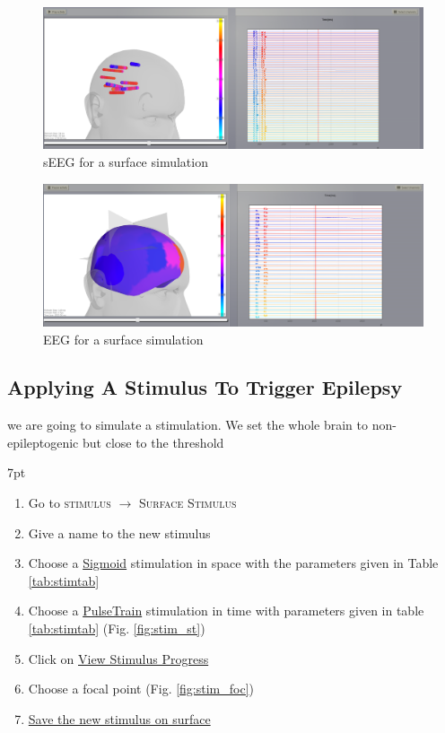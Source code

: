 \documentclass{tufte-handout}
\newenvironment{formal}{%
  \def\FrameCommand{%
    \hspace{1pt}%
    {\color{DarkBlue}\vrule width 2pt}%
    {\color{formalshade}\vrule width 4pt}%
    \colorbox{formalshade}%
  }%
  \MakeFramed{\advance\hsize-\width\FrameRestore}%
  \noindent\hspace{-4.55pt}%
  \begin{adjustwidth}{}{7pt}%
  \vspace{2pt}\vspace{2pt}%
}
{%
  \vspace{2pt}\end{adjustwidth}\endMakeFramed%
}
\begin{document}
\begin{figure}[h]
  \includegraphics[width=\linewidth]{Handout_UI_ModellingAnEpilepticPatient_sEEGSurface}%
  \caption{sEEG for a surface simulation}%
  \label{fig:surf_sEEG}%
\end{figure}

\begin{figure}[h]
  \includegraphics[width=\linewidth]{Handout_UI_ModellingAnEpilepticPatient_EEGSurface}%
  \caption{EEG for a surface simulation}%
  \label{fig:surf_EEG}%
\end{figure}

\subsection{Applying A Stimulus To Trigger Epilepsy}

 we are going to simulate a stimulation.
We set the whole brain to non-epileptogenic but close to the threshold

  \begin{formal}
  \begin{enumerate}
  \item Go to \textsc{stimulus} $\rightarrow$ \textsc{Surface Stimulus}
  \item Give a name to the new stimulus
  \item Choose a \underline{Sigmoid} stimulation in space with the parameters given in Table \ref{tab:stimtab}
  \item Choose a \underline{PulseTrain} stimulation in time with parameters given in table \ref{tab:stimtab} (Fig. \ref{fig:stim_st})
  \item Click on \underline{View Stimulus Progress}
  \item Choose a focal point (Fig. \ref{fig:stim_foc})
  \item \underline{Save the new stimulus on surface}
  \end{enumerate}
\end{formal}
\end{document}
